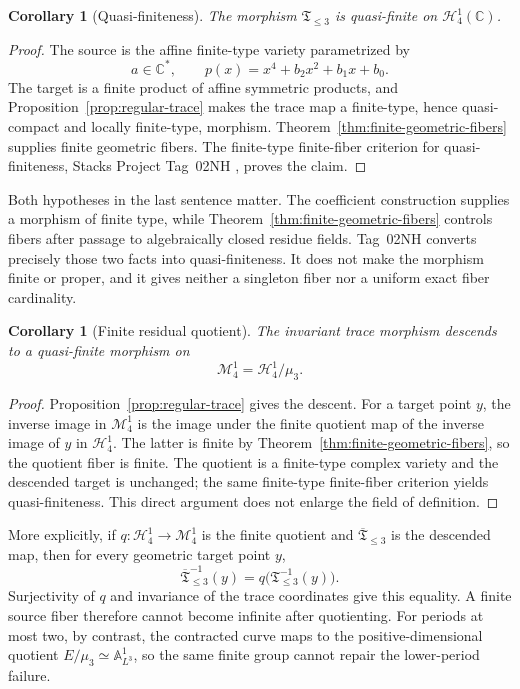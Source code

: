 \documentclass[11pt]{article}
\newtheorem{corollary}[theorem]{Corollary}
\theoremstyle{definition}
\newcommand{\C}{\mathbb C}
\newcommand{\A}{\mathbb A}
\newcommand{\Hn}{\mathcal H}
\newcommand{\Mn}{\mathcal M}
\begin{document}
\begin{corollary}[Quasi-finiteness]
\label{cor:global-quasi-finite}
The morphism $\mathfrak T_{\le3}$ is quasi-finite on $\Hn^1_4(\C)$.
\end{corollary}

\begin{proof}
The source is the affine finite-type variety parametrized by
\[
a\in\C^*,
\qquad
p(x)=x^4+b_2x^2+b_1x+b_0.
\]
The target is a finite product of affine symmetric products, and Proposition~\ref{prop:regular-trace} makes the trace map a finite-type, hence quasi-compact and locally finite-type, morphism. Theorem~\ref{thm:finite-geometric-fibers} supplies finite geometric fibers. The finite-type finite-fiber criterion for quasi-finiteness, Stacks Project Tag~02NH \cite{Stacks02NH}, proves the claim.
\end{proof}

Both hypotheses in the last sentence matter. The coefficient construction supplies a morphism of finite type, while Theorem~\ref{thm:finite-geometric-fibers} controls fibers after passage to algebraically closed residue fields. Tag~02NH converts precisely those two facts into quasi-finiteness. It does not make the morphism finite or proper, and it gives neither a singleton fiber nor a uniform exact fiber cardinality.

\begin{corollary}[Finite residual quotient]
\label{cor:quotient-quasi-finite}
The invariant trace morphism descends to a quasi-finite morphism on
\[
\Mn^1_4=\Hn^1_4/\mu_3.
\]
\end{corollary}

\begin{proof}
Proposition~\ref{prop:regular-trace} gives the descent. For a target point $y$, the inverse image in $\Mn^1_4$ is the image under the finite quotient map of the inverse image of $y$ in $\Hn^1_4$. The latter is finite by Theorem~\ref{thm:finite-geometric-fibers}, so the quotient fiber is finite. The quotient is a finite-type complex variety and the descended target is unchanged; the same finite-type finite-fiber criterion yields quasi-finiteness. This direct argument does not enlarge the field of definition.
\end{proof}

More explicitly, if $q:\Hn^1_4\to\Mn^1_4$ is the finite quotient and $\overline{\mathfrak T}_{\le3}$ is the descended map, then for every geometric target point $y$,
\[
\overline{\mathfrak T}_{\le3}^{-1}(y)
=q\bigl(\mathfrak T_{\le3}^{-1}(y)\bigr).
\]
Surjectivity of $q$ and invariance of the trace coordinates give this equality. A finite source fiber therefore cannot become infinite after quotienting. For periods at most two, by contrast, the contracted curve maps to the positive-dimensional quotient $E/\mu_3\simeq\A^1_{L^3}$, so the same finite group cannot repair the lower-period failure.
\end{document}
